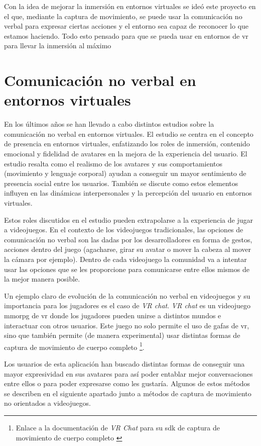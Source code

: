 Con la idea de mejorar la inmersión en entornos virtuales se ideó este proyecto en el que, mediante la captura de movimiento, se puede usar la comunicación no verbal para expresar ciertas acciones y el entorno sea capaz de reconocer lo que estamos haciendo. Todo esto pensado para que se pueda usar en entornos de \gls{vr} para llevar la inmersión al máximo

\section{Comunicación no verbal en entornos virtuales}
En los últimos años se han llevado a cabo distintos estudios sobre la comunicación no verbal en entornos virtuales. El estudio \cite{XGKD23} se centra en el concepto de presencia en entornos virtuales, enfatizando los roles de inmersión, contenido emocional y fidelidad de avatares en la mejora de la experiencia del usuario. El estudio resalta como el realismo de los avatares y sus comportamientos (movimiento y lenguaje corporal) ayudan a conseguir un mayor sentimiento de presencia social entre los usuarios. También se discute como estos elementos influyen en las dinámicas interpersonales  y la percepción del usuario en entornos virtuales.

Estos roles discutidos en el estudio pueden extrapolarse a la experiencia de jugar a videojuegos. En el contexto de los videojuegos tradicionales, las opciones de comunicación no verbal son las dadas por los desarrolladores en forma de gestos, acciones dentro del juego (agacharse, girar su avatar o mover la cabeza al mover la cámara por ejemplo). Dentro de cada videojuego la comunidad va a intentar usar las opciones que se les proporcione para comunicarse entre ellos mismos de la mejor manera posible.

Un ejemplo claro de evolución de la comunicación no verbal en videojuegos y su importancia para los jugadores es el caso de \textit{VR chat}. \textit{VR chat} es un videojuego \gls{mmorpg} de \gls{vr} donde los jugadores pueden unirse a distintos mundos e interactuar con otros usuarios. Este juego no solo permite el uso de gafas de \gls{vr}, sino que también permite (de manera experimental) usar distintas formas de captura de movimiento de cuerpo completo \footnote{Enlace a la documentación de \textit{VR Chat} para su \gls{sdk} de captura de movimiento de cuerpo completo \cite{VRCHATSDK}}.

Los usuarios de esta aplicación han buscado distintas formas de conseguir una mayor expresividad en sus avatares para así poder entablar mejor conversaciones entre ellos o para poder expresarse como les gustaría. Algunos de estos métodos se describen en el siguiente apartado junto a métodos de captura de movimiento no orientados a videojuegos.


